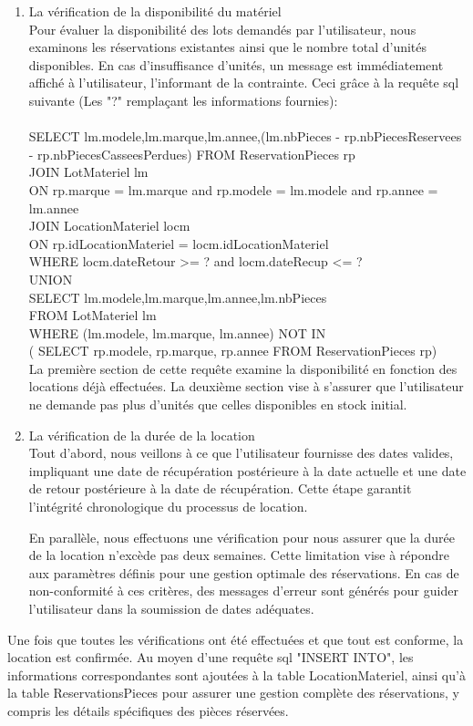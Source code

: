 \begin{enumerate}
    \item La vérification de la disponibilité du matériel\\
    Pour évaluer la disponibilité des lots demandés par l'utilisateur, nous examinons les réservations existantes ainsi que le nombre total d'unités disponibles. En cas d'insuffisance d'unités, un message est immédiatement affiché à l'utilisateur, l'informant de la contrainte.
    Ceci grâce à la requête sql suivante (Les "?" remplaçant les informations fournies): \\
    \\
        SELECT lm.modele,lm.marque,lm.annee,(lm.nbPieces - rp.nbPiecesReservees - rp.nbPiecesCasseesPerdues)
                FROM ReservationPieces rp \\
                JOIN  LotMateriel lm \\
                ON rp.marque = lm.marque and rp.modele = lm.modele and rp.annee = lm.annee \\
                JOIN LocationMateriel locm \\
                ON rp.idLocationMateriel = locm.idLocationMateriel\\ 
                WHERE locm.dateRetour >= ? and locm.dateRecup <= ? \\
                UNION \\
                SELECT lm.modele,lm.marque,lm.annee,lm.nbPieces \\
                FROM LotMateriel lm \\
                WHERE (lm.modele, lm.marque, lm.annee) NOT IN \\
                ( SELECT rp.modele, rp.marque, rp.annee FROM ReservationPieces rp)\\
    La première section de cette requête examine la disponibilité en fonction des locations déjà effectuées. La deuxième section vise à s'assurer que l'utilisateur ne demande pas plus d'unités que celles disponibles en stock initial.
    \item La vérification de la durée de la location\\
    Tout d'abord, nous veillons à ce que l'utilisateur fournisse des dates valides, impliquant une date de récupération postérieure à la date actuelle et une date de retour postérieure à la date de récupération. Cette étape garantit l'intégrité chronologique du processus de location.
    
    En parallèle, nous effectuons une vérification pour nous assurer que la durée de la location n'excède pas deux semaines. Cette limitation vise à répondre aux paramètres définis pour une gestion optimale des réservations. En cas de non-conformité à ces critères, des messages d'erreur sont générés pour guider l'utilisateur dans la soumission de dates adéquates.
\end{enumerate}
Une fois que toutes les vérifications ont été effectuées et que tout est conforme, la location est confirmée. Au moyen d'une requête sql "INSERT INTO", les informations correspondantes sont ajoutées à la table LocationMateriel, ainsi qu'à la table ReservationsPieces pour assurer une gestion complète des réservations, y compris les détails spécifiques des pièces réservées.

